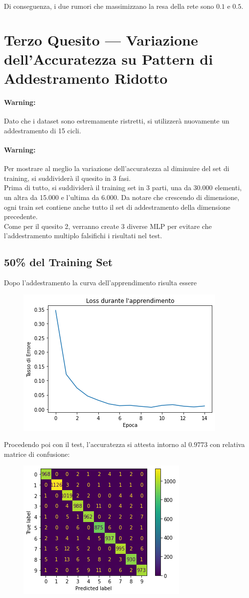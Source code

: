 \documentclass[12pt, a4paper]{article}
\begin{document}
Di conseguenza, i due rumori che massimizzano la resa della rete sono \(0.1\) e \(0.5\).

\newpage
\section{Terzo Quesito --- Variazione dell'Accuratezza su Pattern di Addestramento Ridotto}
\paragraph{Warning: }Dato che i dataset sono estremamente ristretti, si utilizzerà nuovamente un addestramento di 15 cicli.
\paragraph{Warning: }Per mostrare al meglio la variazione dell'accuratezza al diminuire del set di training, si suddividerà il quesito in 3 fasi.
\\
Prima di tutto, si suddividerà il training set in 3 parti, una da 30.000 elementi, un altra da 15.000 e l'ultima da 6.000. Da notare che crescendo di dimensione, ogni train set contiene anche tutto il set di addestramento della dimensione precedente. \\
Come per il quesito 2, verranno create 3 diverse MLP per evitare che l'addestramento multiplo falsifichi i risultati nel test.
\subsection{50\% del Training Set}
Dopo l'addestramento la curva dell'apprendimento risulta essere
\begin{figure}[H]
    \centering
    \includegraphics[width=.5\textwidth]{Set50.png}
\end{figure}

Procedendo poi con il test, l'accuratezza si attesta intorno al \(0.9773\) con relativa matrice di confusione:
\begin{figure}[H]
    \centering
    \includegraphics[width=.5\textwidth]{Matrix50.png}
\end{figure}
\end{document}
